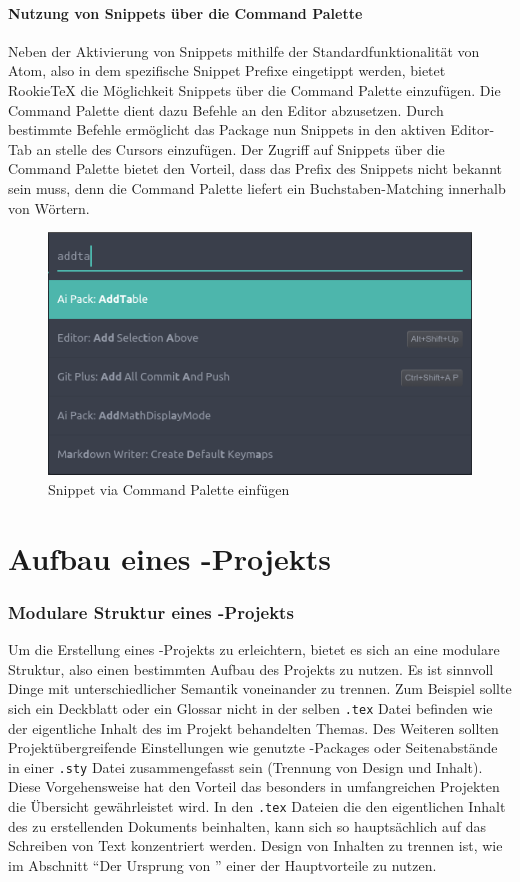         \subsection{Nutzung von Snippets über die Command Palette}
            Neben der Aktivierung von Snippets mithilfe der Standardfunktionalität von Atom, also in dem spezifische Snippet Prefixe eingetippt werden, bietet RookieTeX die Möglichkeit Snippets über die Command Palette einzufügen. Die Command Palette dient dazu Befehle an den Editor abzusetzen. Durch bestimmte Befehle ermöglicht das Package nun \latex Snippets in den aktiven Editor-Tab an stelle des Cursors einzufügen. Der Zugriff auf Snippets über die Command Palette bietet den Vorteil, dass das Prefix des Snippets nicht bekannt sein muss, denn die Command Palette liefert ein Buchstaben-Matching innerhalb von Wörtern.
            \begin{figure}[H]
                \centering
                    \includegraphics[scale=0.7]{img/snippets_via_cp.png}
                    \caption{Snippet via Command Palette einfügen}
            \end{figure}

\part{Aufbau eines \tex-Projekts}
    \section{Modulare Struktur eines \tex-Projekts}
    Um die Erstellung eines \tex-Projekts zu erleichtern, bietet es sich an eine modulare Struktur, also einen bestimmten Aufbau des Projekts zu nutzen. Es ist sinnvoll Dinge mit unterschiedlicher Semantik voneinander zu trennen. Zum Beispiel sollte sich ein Deckblatt oder ein Glossar nicht in der selben \texttt{.tex} Datei befinden wie der eigentliche Inhalt des im Projekt behandelten Themas. Des Weiteren sollten Projektübergreifende Einstellungen wie genutzte \latex-Packages oder Seitenabstände in einer \texttt{.sty} Datei zusammengefasst sein (Trennung von Design und Inhalt). Diese Vorgehensweise hat den Vorteil das besonders in umfangreichen Projekten die Übersicht gewährleistet wird. In den \texttt{.tex} Dateien die den eigentlichen Inhalt des zu erstellenden Dokuments beinhalten, kann sich so hauptsächlich auf das Schreiben von Text konzentriert werden. Design von Inhalten zu trennen ist, wie im Abschnitt "`Der Ursprung von \latex"' einer der Hauptvorteile \latex zu nutzen.


